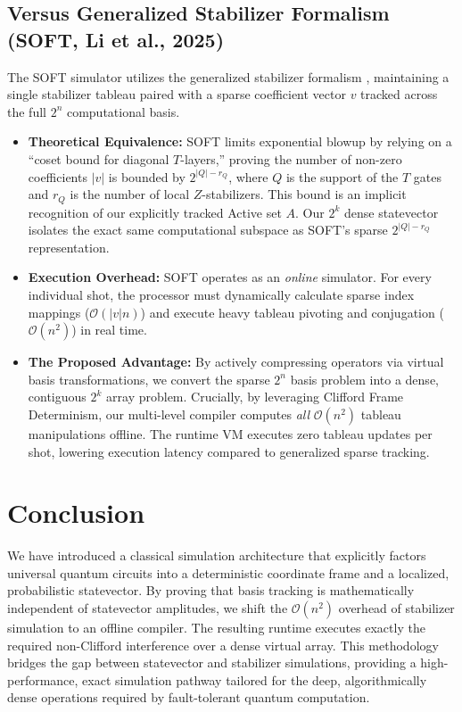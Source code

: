 \documentclass[11pt]{article}
\begin{document}
\subsection{Versus Generalized Stabilizer Formalism (SOFT, Li et al., 2025)}
The SOFT simulator \cite{li2025soft} utilizes the generalized stabilizer formalism \cite{yoder2012}, maintaining a single stabilizer tableau paired with a sparse coefficient vector $v$ tracked across the full $2^n$ computational basis.
\begin{itemize}
    \item \textbf{Theoretical Equivalence:} SOFT limits exponential blowup by relying on a ``coset bound for diagonal $T$-layers,'' proving the number of non-zero coefficients $|v|$ is bounded by $2^{|Q|-r_Q}$, where $Q$ is the support of the $T$ gates and $r_Q$ is the number of local $Z$-stabilizers. This bound is an implicit recognition of our explicitly tracked Active set $A$. Our $2^k$ dense statevector isolates the exact same computational subspace as SOFT's sparse $2^{|Q|-r_Q}$ representation.
    \item \textbf{Execution Overhead:} SOFT operates as an \textit{online} simulator. For every individual shot, the processor must dynamically calculate sparse index mappings ($\mathcal{O}(|v|n)$) and execute heavy tableau pivoting and conjugation ($\mathcal{O}(n^2)$) in real time.
    \item \textbf{The Proposed Advantage:} By actively compressing operators via virtual basis transformations, we convert the sparse $2^n$ basis problem into a dense, contiguous $2^k$ array problem. Crucially, by leveraging Clifford Frame Determinism, our multi-level compiler computes \textit{all} $\mathcal{O}(n^2)$ tableau manipulations offline. The runtime VM executes zero tableau updates per shot, lowering execution latency compared to generalized sparse tracking.
\end{itemize}

\section{Conclusion}

We have introduced a classical simulation architecture that explicitly factors universal quantum circuits into a deterministic coordinate frame and a localized, probabilistic statevector. By proving that basis tracking is mathematically independent of statevector amplitudes, we shift the $\mathcal{O}(n^2)$ overhead of stabilizer simulation to an offline compiler. The resulting runtime executes exactly the required non-Clifford interference over a dense virtual array. This methodology bridges the gap between statevector and stabilizer simulations, providing a high-performance, exact simulation pathway tailored for the deep, algorithmically dense operations required by fault-tolerant quantum computation.
\end{document}
